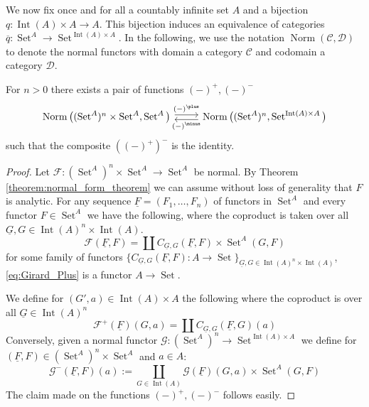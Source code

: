 \documentclass[runningheads]{llncs}
\newcommand{\scr}[1]{\mathscr{#1}}
\newcommand{\call}[1]{\mathcal{#1}}
\newcommand{\Ccal}{\call{C}}
\newcommand{\Dcal}{\call{D}}
\newcommand{\lto}{\longrightarrow}
\DeclareMathOperator{\set}{Set}
\begin{document}
We now fix once and for all a countably infinite set $A$ and a bijection $q: \operatorname{Int}(A) \times A \lto A$. This bijection induces an equivalence of categories $\overline{q}: \set^A \lto \set^{\operatorname{Int}(A) \times A}$. In the following, we use the notation $\operatorname{Norm}(\Ccal, \Dcal)$ to denote the normal functors with domain a category $\Ccal$ and codomain a category $\Dcal$.

\begin{lemma}
    For $n > 0$ there exists a pair of functions $(-)^\plus, (-)^\minus$
    \begin{equation}
        \begin{tikzcd}
            \operatorname{Norm}\big((\set^A)^n \times \set^A, \set^A\big)\arrow[r,shift left, "{(-)^\plus}"] & \operatorname{Norm}\big((\set^A)^n, \set^{\operatorname{Int}(A) \times A}\big)\arrow[l, shift left, "{(-)^{\minus}}"]
        \end{tikzcd}
    \end{equation}
    such that the composite $((-)^+)^\minus$ is the identity.
\end{lemma}
\begin{proof}
    Let $\scr{F}: (\set^A)^n \times \set^A \lto \set^A$ be normal. By Theorem \ref{theorem:normal_form_theorem} we can assume without loss of generality that $F$ is analytic. For any sequence $\underline{F} = (F_1, \ldots, F_n)$ of functors in $\set^A$ and every functor $F \in \set^A$ we have the following, where the coproduct is taken over all $\underline{G}, G \in \operatorname{Int}(A)^{n} \times \operatorname{Int}(A)$.
    \begin{equation}\label{eq:Girard_Plus}
        \scr{F}(\underline{F}, F) = \coprod C_{\underline{G}, G}(\underline{F},F) \times \operatorname{Set}^A(G, F)
    \end{equation}
    for some family of functors $\{ C_{\underline{G},G}(\underline{F}, F): A \lto \set\}_{\underline{G},G \in \operatorname{Int}(A)^n \times \operatorname{Int}(A) }$, \eqref{eq:Girard_Plus} is a functor $A \lto \set$.

    We define for $(G', a) \in \operatorname{Int}(A) \times A$ the following where the coproduct is over all $\underline{G} \in \operatorname{Int}(A)^n$
    \begin{equation}
        \scr{F}^+(\underline{F})(G, a) = \coprod C_{\underline{G}, G}(\underline{F}, G)(a)
    \end{equation}
    Conversely, given a normal functor $\scr{G}: (\set^A)^n \lto \set^{\operatorname{Int}(A) \times A}$ we define for $(\underline{F},F) \in (\set^A)^n \times \set^A$ and $a \in A$:
    \begin{equation}
        \scr{G}^-(\underline{F}, F)(a) := \coprod_{G \in \operatorname{Int}(A)} \scr{G}(\underline{F})(G,a) \times \set^A(G, F)
    \end{equation}
    The claim made on the functions $(-)^\plus, (-)^\minus$ follows easily.
\end{proof}
\end{document}
